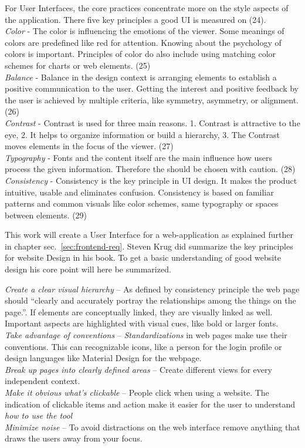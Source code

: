 \documentclass[american,a4paper,oneside,,tablecaptionabove]{scrbook}
\begin{document}
For User Interfaces, the core practices concentrate more on the style
aspects of the application. There five key principles a good UI is
measured on (24).\\
\emph{Color} - The color is influencing the emotions of the viewer. Some
meanings of colors are predefined like red for attention. Knowing about
the psychology of colors is important. Principles of color do also
include using matching color schemes for charts or web elements. (25)\\
\emph{Balance} - Balance in the design context is arranging elements to
establish a positive communication to the user. Getting the interest and
positive feedback by the user is achieved by multiple criteria, like
symmetry, asymmetry, or alignment. (26)\\
\emph{Contrast} - Contrast is used for three main reasons. 1. Contrast
is attractive to the eye, 2. It helps to organize information or build a
hierarchy, 3. The Contrast moves elements in the focus of the viewer.
(27)\\
\emph{Typography} - Fonts and the content itself are the main influence
how users process the given information. Therefore the should be chosen
with caution. (28)\\
\emph{Consistency} - Consistency is the key principle in UI design. It
makes the product intuitive, usable and eliminates confusion.
Consistency is based on familiar patterns and common visuals like color
schemes, same typography or spaces between elements. (29)

This work will create a User Interface for a web-application as
explained further in chapter sec.~\ref{sec:frontend-req}. Steven Krug
did summarize the key principles for website Design in his book. To get
a basic understanding of good website design his core point will here be
summarized.

\emph{Create a clear visual hierarchy} -- As defined by consistency
principle the web page should \enquote{clearly and accurately portray
the relationships among the things on the page.}. If elements are
conceptually linked, they are visually linked as well. Important aspects
are highlighted with visual cues, like bold or larger fonts.\\
\emph{Take advantage of conventions} -- \emph{Standardizations} in web
pages make use their conventions. This can recognizable icons, like a
person for the login profile or design languages like Material Design
for the webpage.\\
\emph{Break up pages into clearly defined areas} -- Create different
views for every independent context.\\
\emph{Make it obvious what's clickable} -- People click when using a
website. The indication of clickable items and action make it easier for
the user to understand \emph{how to use the tool}\\
\emph{Minimize noise} -- To avoid distractions on the web interface
remove anything that draws the users away from your focus.
\end{document}

